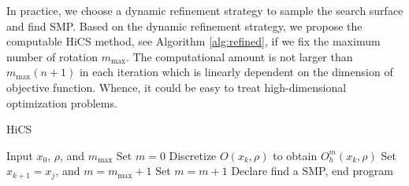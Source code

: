\documentclass[final,1p,times]{elsarticle}
\begin{document}
In practice, we choose a dynamic refinement strategy to sample
the search surface and find SMP.
Based on the dynamic refinement strategy, we propose the
computable HiCS method, see Algorithm \ref{alg:refined}, 
if we fix the maximum number of rotation $m_{\max}$.
The computational amount is not larger than $m_{\max}(n+1)$ in
each iteration which is linearly dependent on the dimension of
objective function.
Whence, it could be easy to treat high-dimensional optimization
problems.
\begin{algorithm}[H]
	\caption{\label{alg:refined}HiCS}
\begin{algorithmic}[1]
	\STATE Input $x_0$, $\rho$, and $m_{\max}$
		\STATE Set $m=0$
			\STATE Discretize $O(x_k,\rho)$ to obtain $O^m_h(x_k,\rho)$
				\STATE Set $x_{k+1}=x_j$, and $m=m_{\max}+1$
			\ELSE
				\STATE Set $m = m+1$
			\ENDIF
		\ELSE
			\STATE Declare find a SMP, end program
		\ENDIF
	\ENDFOR
\end{algorithmic}
\end{algorithm}
\end{document}
